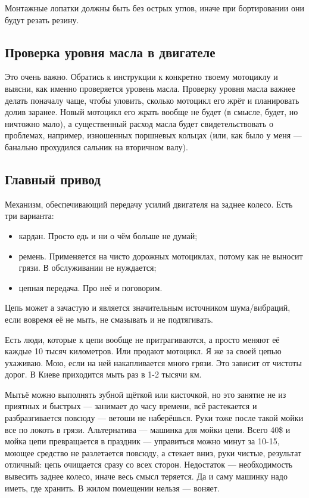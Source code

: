 \documentclass[12pt,a4paper]{article}
\begin{document}
Монтажные лопатки должны быть без острых углов, иначе при бортировании
они будут резать резину.

\subsection{Проверка уровня масла в двигателе}

Это очень важно. Обратись к инструкции к конкретно твоему мотоциклу и
выясни, как именно проверяется уровень масла. Проверку уровня масла важнее
делать поначалу чаще, чтобы уловить, сколько мотоцикл его жрёт и планировать
долив заранее. Новый мотоцикл его жрать вообще не будет (в смысле, будет,
но ничтожно мало), а существенный расход масла будет свидетельствовать о
проблемах, например, изношенных поршневых кольцах (или, как было у меня ---
банально прохудился сальник на вторичном валу).

\subsection{Главный привод}

Механизм, обеспечивающий передачу усилий двигателя на заднее колесо. Есть
три варианта:

\begin{itemize}
\item кардан. Просто едь и ни о чём больше не думай;
\item ремень. Применяется на чисто дорожных мотоциклах, потому как не
выносит грязи. В обслуживании не нуждается;
\item цепная передача. Про неё и поговорим.
\end{itemize}

Цепь может а зачастую и является значительным источником шума/вибраций,
если вовремя её не мыть, не смазывать и не подтягивать.

Есть люди, которые к цепи вообще не притрагиваются, а просто меняют
её каждые 10 тысяч километров. Или продают мотоцикл. Я же за своей
цепью ухаживаю. Мою, если на ней накапливается много грязи. Это зависит
от чистоты дорог. В Киеве приходится мыть раз в 1-2 тысячи км.

Мытьё можно выполнять зубной щёткой или кисточкой, но это занятие
не из приятных и быстрых --- занимает до часу времени, всё растекается
и разбразгивается повсюду --- ветоши не наберёшься. Руки тоже после
такой мойки все по локоть в грязи. Альтернатива --- машинка для мойки
цепи. Всего 40\$ и мойка цепи превращается в праздник --- управиться
можно минут за 10-15, моющее средство не разлетается повсюду, а
стекает вниз, руки чистые, результат отличный: цепь очищается сразу
со всех сторон. Недостаток --- необходимость вывесить заднее
колесо, иначе весь смысл теряется. Да и саму машинку надо иметь, где
хранить. В жилом помещении нельзя --- воняет.
\end{document}
